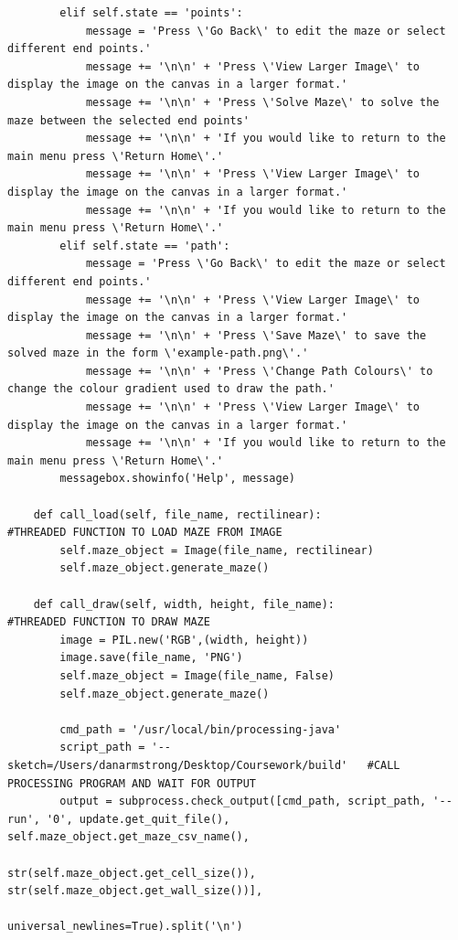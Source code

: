 \documentclass[titlepage]{article}
\begin{document}
\begin{changemargin}{-1in}{-1in}
\begin{verbatim}
        elif self.state == 'points':
            message = 'Press \'Go Back\' to edit the maze or select different end points.'
            message += '\n\n' + 'Press \'View Larger Image\' to display the image on the canvas in a larger format.'
            message += '\n\n' + 'Press \'Solve Maze\' to solve the maze between the selected end points'
            message += '\n\n' + 'If you would like to return to the main menu press \'Return Home\'.'
            message += '\n\n' + 'Press \'View Larger Image\' to display the image on the canvas in a larger format.'
            message += '\n\n' + 'If you would like to return to the main menu press \'Return Home\'.'
        elif self.state == 'path':
            message = 'Press \'Go Back\' to edit the maze or select different end points.'
            message += '\n\n' + 'Press \'View Larger Image\' to display the image on the canvas in a larger format.'
            message += '\n\n' + 'Press \'Save Maze\' to save the solved maze in the form \'example-path.png\'.'
            message += '\n\n' + 'Press \'Change Path Colours\' to change the colour gradient used to draw the path.'
            message += '\n\n' + 'Press \'View Larger Image\' to display the image on the canvas in a larger format.'
            message += '\n\n' + 'If you would like to return to the main menu press \'Return Home\'.'
        messagebox.showinfo('Help', message)
        
    def call_load(self, file_name, rectilinear):                                #THREADED FUNCTION TO LOAD MAZE FROM IMAGE
        self.maze_object = Image(file_name, rectilinear)
        self.maze_object.generate_maze()

    def call_draw(self, width, height, file_name):                              #THREADED FUNCTION TO DRAW MAZE 
        image = PIL.new('RGB',(width, height))
        image.save(file_name, 'PNG')
        self.maze_object = Image(file_name, False)
        self.maze_object.generate_maze()

        cmd_path = '/usr/local/bin/processing-java'
        script_path = '--sketch=/Users/danarmstrong/Desktop/Coursework/build'   #CALL PROCESSING PROGRAM AND WAIT FOR OUTPUT
        output = subprocess.check_output([cmd_path, script_path, '--run', '0', update.get_quit_file(), self.maze_object.get_maze_csv_name(),
                                          str(self.maze_object.get_cell_size()), str(self.maze_object.get_wall_size())],
                                          universal_newlines=True).split('\n')
        

\end{verbatim}
\end{changemargin}
\end{document}
